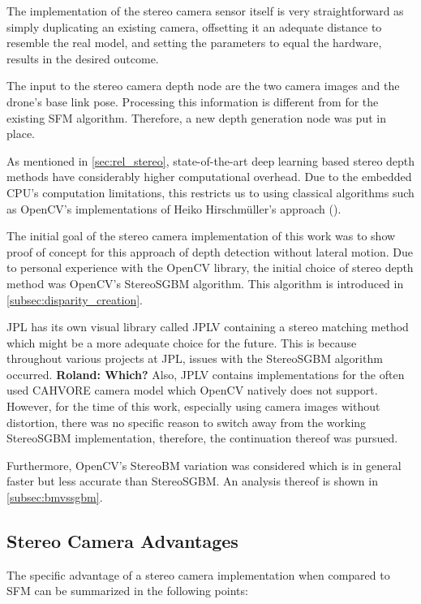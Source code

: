 The implementation of the stereo camera sensor itself is very straightforward as simply duplicating an existing camera, offsetting it an adequate distance to resemble the real model, and setting the parameters to equal the hardware, results in the desired outcome.

The input to the stereo camera depth node are the two camera images and the drone's base link pose. Processing this information is different from for the existing SFM algorithm. Therefore, a new depth generation node was put in place. 

As mentioned in \cref{sec:rel_stereo}, state-of-the-art deep learning based stereo depth methods have considerably higher computational overhead. Due to the embedded CPU's computation limitations, this restricts us to using classical algorithms such as OpenCV's implementations of Heiko Hirschmüller's approach (\citep{Stereo}).

The initial goal of the stereo camera implementation of this work was to show proof of concept for this approach of depth detection without lateral motion. Due to personal experience with the OpenCV library, the initial choice of stereo depth method was OpenCV's StereoSGBM algorithm. This algorithm is introduced in \cref{subsec:disparity_creation}.

JPL has its own visual library called JPLV containing a stereo matching method which might be a more adequate choice for the future. This is because throughout various projects at JPL, issues with the StereoSGBM algorithm occurred. \textbf{\@ Roland: Which?}
Also, JPLV contains implementations for the often used CAHVORE camera model which OpenCV natively does not support. However, for the time of this work, especially using camera images without distortion, there was no specific reason to switch away from the working StereoSGBM implementation, therefore, the continuation thereof was pursued.

Furthermore, OpenCV's StereoBM variation was considered which is in general faster but less accurate than StereoSGBM. An analysis thereof is shown in \cref{subsec:bmvssgbm}.


\subsection{Stereo Camera Advantages}

The specific advantage of a stereo camera implementation when compared to SFM can be summarized in the following points:

